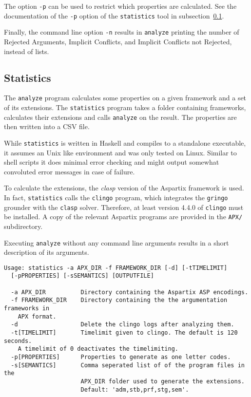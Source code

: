 \documentclass[parskip=half]{scrartcl}
\begin{document}
The option \texttt{-p} can be used to restrict which properties are calculated.
See the documentation of the \texttt{-p} option of the \texttt{statistics} tool
in subsection~\ref{statistics}.

Finally, the command line option \texttt{-n} results in \texttt{analyze}
printing the number of Rejected Arguments, Implicit Conflicts, and Implicit
Conflicts not Rejected, instead of lists.

\subsection{Statistics}
\label{statistics}

The \texttt{analyze} program calculates some properties on a given framework and
a set of its extensions. The \texttt{statistics} program takes a folder
containing frameworks, calculates their extensions and calls \texttt{analyze} on
the result. The properties are then written into a CSV file.

While \texttt{statistics} is written in Haskell and compiles to a standalone
executable, it assumes an Unix like environment and was only tested on Linux.
Similar to shell scripts it does minimal error checking and might output
somewhat convoluted error messages in case of failure.

To calculate the extensions, the \emph{clasp} version of the Aspartix framework
is used.  In fact, \texttt{statistics} calls the \texttt{clingo} program, which
integrates the \texttt{gringo} grounder with the \texttt{clasp} solver.
Therefore, at least version 4.4.0 of \texttt{clingo} must be installed.  A copy of the
relevant Aspartix programs are provided in the \texttt{APX/} subdirectory.

Executing \texttt{analyze} without any command line arguments results in a short
description of its arguments.
\begin{verbatim}
Usage: statistics -a APX_DIR -f FRAMEWORK_DIR [-d] [-tTIMELIMIT]
  [-pPROPERTIES] [-sSEMANTICS] [OUTPUTFILE]

  -a APX_DIR          Directory containing the Aspartix ASP encodings.
  -f FRAMEWORK_DIR    Directory containing the the argumentation frameworks in
    APX format.
  -d                  Delete the clingo logs after analyzing them.
  -t[TIMELIMIT]       Timelimit given to clingo. The default is 120 seconds.
    A timelimit of 0 deactivates the timelimiting.
  -p[PROPERTIES]      Properties to generate as one letter codes.
  -s[SEMANTICS]       Comma seperated list of of the program files in the
                      APX_DIR folder used to generate the extensions.
                      Default: 'adm,stb,prf,stg,sem'.
\end{verbatim}
\end{document}
